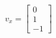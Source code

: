 \documentclass[preview]{standalone}
\begin{document}
\begin{align*}
v_x=\begin{bmatrix}
                        0\\
                        1\\
                        -1
                        \end{bmatrix}\\
\end{align*}
\end{document}
